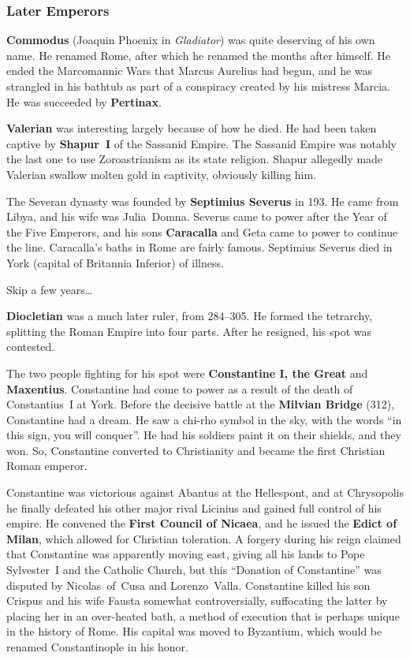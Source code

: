 \subsubsection*{Later Emperors}

\textbf{Commodus} (Joaquin Phoenix in \textit{Gladiator}) was quite deserving of his own name.
He renamed Rome, after which he renamed the months after himself.
He ended the Marcomannic Wars that Marcus Aurelius had begun,
and he was strangled in his bathtub as part of a conspiracy created by his mistress Marcia.
He was succeeded by \textbf{Pertinax}.

\textbf{Valerian} was interesting largely because of how he died.
He had been taken captive by \textbf{Shapur~I} of the Sassanid Empire.
The Sassanid Empire was notably the last one to use Zoroastrianism as its state religion.
Shapur allegedly made Valerian swallow molten gold in captivity, obviously killing him.

The Severan dynasty was founded by \textbf{Septimius Severus} in 193.
He came from Libya, and his wife was Julia~Domna.
Severus came to power after the Year of the Five Emperors,
and his sons \textbf{Caracalla} and Geta came to power to continue the line.
Caracalla's baths in Rome are fairly famous.
Septimius Severus died in York (capital of Britannia Inferior) of illness.

Skip a few years\ldots{}

\textbf{Diocletian} was a much later ruler, from 284--305.
He formed the tetrarchy, splitting the Roman Empire into four parts.
After he resigned, his spot was contested.

The two people fighting for his spot were \textbf{Constantine I, the Great} and \textbf{Maxentius}.
Constantine had come to power as a result of the death of Constantius~I at York.
Before the decisive battle at the \textbf{Milvian Bridge} (312), Constantine had a dream.
He saw a chi-rho symbol in the sky, with the words ``in this sign, you will conquer''.
He had his soldiers paint it on their shields, and they won.
So, Constantine converted to Christianity and became the first Christian Roman emperor.

Constantine was victorious against Abantus at the Hellespont,
and at Chrysopolis he finally defeated his other major rival Licinius and gained full control of his empire.
He convened the \textbf{First Council of Nicaea},
and he issued the \textbf{Edict of Milan}, which allowed for Christian toleration.
A forgery during his reign claimed that Constantine was apparently moving east,
giving all his lands to Pope Sylvester~I and the Catholic Church,
but this ``Donation of Constantine'' was disputed by Nicolas~of~Cusa and Lorenzo~Valla.
Constantine killed his son Crispus and his wife Fausta somewhat controversially,
suffocating the latter by placing her in an over-heated bath,
a method of execution that is perhaps unique in the history of Rome.
His capital was moved to Byzantium, which would be renamed Constantinople in his honor.
